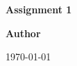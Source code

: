 \documentclass[openany, oneside]{report}[12pt]
\begin{document}
\begin{titlepage}
	\begin{center}
		\LARGE
		\vspace{2cm}

		\textbf{Assignment 1}
		\vspace{2cm}

		\textbf{Author}
		\vspace{1cm}

		\today
	\end{center}
\end{titlepage}
\end{document}
